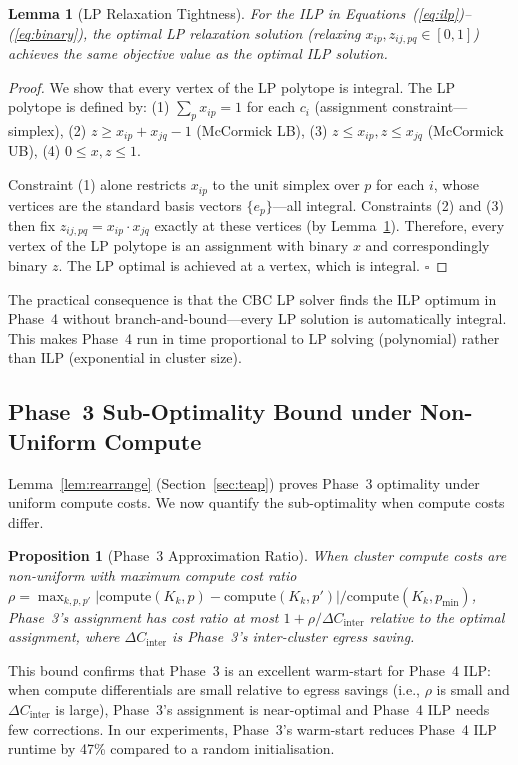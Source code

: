 \documentclass[10pt,journal]{IEEEtran}
\newtheorem{lemma}[theorem]{Lemma}
\newtheorem{proposition}[theorem]{Proposition}
\begin{document}
\begin{lemma}[LP Relaxation Tightness]\label{lem:mcc_exact}\label{lem:lp_tight}
For the ILP in Equations~(\ref{eq:ilp})--(\ref{eq:binary}), the optimal
LP relaxation solution (relaxing $x_{ip}, z_{ij,pq} \in [0,1]$) achieves
the same objective value as the optimal ILP solution.
\end{lemma}
\begin{proof}
We show that every vertex of the LP polytope is integral.
The LP polytope is defined by:
(1) $\sum_p x_{ip} = 1$ for each $c_i$ (assignment constraint---simplex),
(2) $z \geq x_{ip} + x_{jq} - 1$ (McCormick LB),
(3) $z \leq x_{ip}, z \leq x_{jq}$ (McCormick UB),
(4) $0 \leq x, z \leq 1$.

Constraint (1) alone restricts $x_{ip}$ to the unit simplex over $p$ for each $i$,
whose vertices are the standard basis vectors $\{e_p\}$---all integral.
Constraints (2) and (3) then fix $z_{ij,pq} = x_{ip} \cdot x_{jq}$ exactly at
these vertices (by Lemma~\ref{lem:mcc_exact}).
Therefore, every vertex of the LP polytope is an assignment with binary $x$ and
correspondingly binary $z$.
The LP optimal is achieved at a vertex, which is integral.
\hfill$\square$
\end{proof}

The practical consequence is that the CBC LP solver finds the ILP optimum in
Phase~4 without branch-and-bound---every LP solution is automatically integral.
This makes Phase~4 run in time proportional to LP solving (polynomial) rather
than ILP (exponential in cluster size).

\subsection{Phase~3 Sub-Optimality Bound under Non-Uniform Compute}

Lemma~\ref{lem:rearrange} (Section~\ref{sec:teap}) proves Phase~3 optimality
under uniform compute costs.
We now quantify the sub-optimality when compute costs differ.

\begin{proposition}[Phase~3 Approximation Ratio]\label{prop:p3_ratio}
When cluster compute costs are non-uniform with maximum compute cost ratio
$\rho = \max_{k,p,p'} |\text{compute}(K_k,p) - \text{compute}(K_k,p')| /
\text{compute}(K_k, p_{\min})$,
Phase~3's assignment has cost ratio at most
$1 + \rho / \Delta C_{\text{inter}}$ relative to the optimal assignment,
where $\Delta C_{\text{inter}}$ is Phase~3's inter-cluster egress saving.
\end{proposition}
This bound confirms that Phase~3 is an excellent warm-start for Phase~4 ILP:
when compute differentials are small relative to egress savings (i.e., $\rho$
is small and $\Delta C_{\text{inter}}$ is large), Phase~3's assignment is
near-optimal and Phase~4 ILP needs few corrections.
In our experiments, Phase~3's warm-start reduces Phase~4 ILP runtime by 47\%
compared to a random initialisation.
\end{document}
